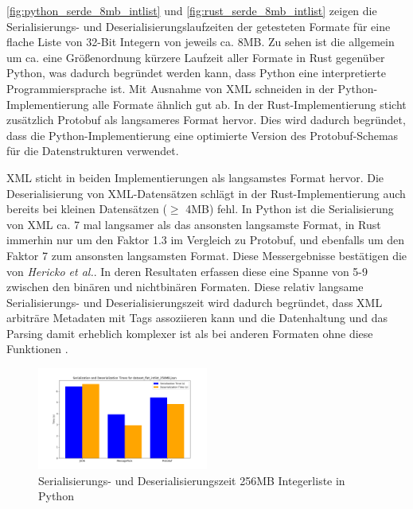 \documentclass[ngerman]{seminarvorlage}
\begin{document}
\autoref{fig:python_serde_8mb_intlist} und \autoref{fig:rust_serde_8mb_intlist} zeigen die Serialisierungs- und Deserialisierungslaufzeiten der getesteten Formate für eine flache Liste von 32-Bit Integern von jeweils ca. 8MB. Zu sehen ist die allgemein um ca. eine Größenordnung kürzere Laufzeit aller Formate in Rust gegenüber Python, was dadurch begründet werden kann, dass Python eine interpretierte Programmiersprache ist. Mit Ausnahme von XML schneiden in der Python-Implementierung alle Formate ähnlich gut ab. In der Rust-Implementierung sticht zusätzlich Protobuf als langsameres Format hervor. Dies wird dadurch begründet, dass die Python-Implementierung eine optimierte Version des Protobuf-Schemas für die Datenstrukturen verwendet. 

XML sticht in beiden Implementierungen als langsamstes Format hervor. Die Deserialisierung von XML-Datensätzen schlägt in der Rust-Implementierung auch bereits bei kleinen Datensätzen ($\ge$ 4MB) fehl. In Python ist die Serialisierung von XML ca. 7 mal langsamer als das ansonsten langsamste Format, in Rust immerhin nur um den Faktor 1.3 im Vergleich zu Protobuf, und ebenfalls um den Faktor 7 zum ansonsten langsamsten Format. Diese Messergebnisse bestätigen die von \textit{Hericko et al.}. In deren Resultaten erfassen diese eine Spanne von 5-9 \cite{10.1145/944579.944589, Kapitel 5} zwischen den binären und nichtbinären Formaten. Diese relativ langsame Serialisierungs- und Deserialisierungszeit wird dadurch begründet, dass XML arbiträre Metadaten mit Tags assoziieren kann und die Datenhaltung und das Parsing damit erheblich komplexer ist als bei anderen Formaten ohne diese Funktionen \cite{10.1145/944579.944589, Kapitel 4.1}.

\begin{figure}[h]
  \centering
  \includegraphics[width=0.5\textwidth]{images/graphs/python_dataset_flat_intlist_256MB_json_combined_times.png}
  \caption{Serialisierungs- und Deserialisierungszeit 256MB Integerliste in Python}
  \label{fig:python_serde_256mb_intlist}
\end{figure}
\end{document}
